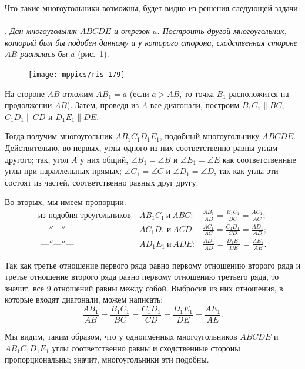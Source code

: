 \documentclass[oneside]{book}
\begin{document}
Что такие многоугольники возможны, будет видно из решения следующей задачи:

\paragraph{}\label{1938/169}
.
\emph{Дан многоугольник $ABCDE$ и отрезок $a$.
Построить другой многоугольник, который был бы подобен данному и у которого сторона, сходственная стороне $AB$ 
равнялась бы $a$} (рис.~\ref{1938/ris-179}).

\begin{figure}[h]
\centering
\texttt{[image: mppics/ris-179]}
\caption{}\label{1938/ris-179}
\end{figure}

На стороне $AB$ отложим $AB_1=a$ (если $a>AB$, то точка $B_1$ расположится на продолжении $AB$).
Затем, проведя из $A$ все диагонали, построим $B_1C_1 \parallel BC$, $C_1D_1\parallel CD$ и $D_1E_1\parallel DE$.

Тогда получим многоугольник $AB_1C_1D_1E_1$, подобный многоугольнику $ABCDE$.
Действительно, во-первых, углы одного из них соответственно равны углам другого;
так, угол $A$ у них общий, $\angle B_1=\angle B$ и $\angle E_1=\angle E$ как соответственные углы при параллельных прямых;
$\angle C_1=\angle C$ и $\angle D_1=\angle D$, так как углы эти состоят из частей, соответственно равных друг другу.

Во-вторых, мы имеем пропорции:
\begin{align*}
\text{из подобия треугольников}&\ AB_1C_1\ \text{и}\ ABC:
&
\frac{AB_1}{AB}=\frac{B_1C_1}{BC}=\frac{AC_1}{AC};
\\
\text{\ \ ---″---″---\ \ \ \ \ \ \ \ \ \ \ \ \ \ \ \ }&\ AC_1D_1\ \text{и}\ ACD:
&
\frac{AC_1}{AC}=\frac{C_1D_1}{CD}=\frac{AD_1}{AD};
\\
\text{\ \ ---″---″---\ \ \ \ \ \ \ \ \ \ \ \ \ \ \ \ }&\ AD_1E_1\ \text{и}\ ADE:
&
\frac{AD_1}{AD}=\frac{D_1E_1}{DE}=\frac{AE_1}{AE}.
\end{align*}

Так как третье отношение первого ряда равно первому отношению второго ряда и третье отношение второго ряда равно первому отношению третьего ряда, то значит, все 9 отношений равны между собой.
Выбросив из них отношения, в которые входят диагонали, можем написать:
\[\frac{AB_1}{AB}=\frac{B_1C_1}{BC}=\frac{C_1D_1}{CD}=\frac{D_1E_1}{DE}=\frac{AE_1}{AE}.\]

Мы видим, таким образом, что у одноимённых %
многоугольников $ABCDE$ и $AB_1C_1D_1E_1$ углы соответственно равны и сходственные стороны пропорциональны;
значит, многоугольники эти подобны.
\end{document}
